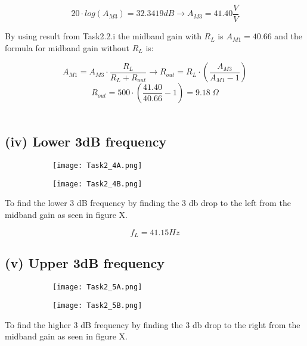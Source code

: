 		$$ 20 \cdot log(A_{M3}) = 32.3419 dB  \rightarrow A_{M3} = 41.40 \frac{V}{V}$$


	By using result from Task2.2.i the midband gain with $R_{L}$ is $A_{M1} = 40.66$ and the formula for midband gain without $R_{L}$ is:

	$$A_{M1} = A_{M3} \cdot \frac{R_{L}}{R_{L} + R_{out}} \rightarrow R_{out} = R_{L} \cdot (\frac{A_{M3}}{A_{M1} - 1})  $$
	$$R_{out} = 500 \cdot (\frac{41.40}{40.66}-1) = 9.18\ \Omega$$ \\


	\subsection*{(iv) Lower 3dB frequency}

	\begin{figure}[h!]
	    \centering
	    \begin{subfigure}[h]{0.7\textwidth}
	            \texttt{[image: Task2\_4A.png]}
	            \label{fig:}
	    \end{subfigure}
	    \begin{subfigure}[h]{0.25\textwidth}
	            \texttt{[image: Task2\_4B.png]}
	            \label{fig:}
	    \end{subfigure}
	\end{figure}

	To find the lower 3 dB frequency by finding the 3 db drop to the left from the midband gain as seen in figure X.

	$$f_{L} =  41.15 Hz$$




	
	\subsection*{(v) Upper 3dB frequency}

	\begin{figure}[h!]
	    \centering
	    \begin{subfigure}[h]{0.7\textwidth}
	            \texttt{[image: Task2\_5A.png]}
	            \label{fig:}
	    \end{subfigure}
	    \begin{subfigure}[h]{0.25\textwidth}
	            \texttt{[image: Task2\_5B.png]}
	            \label{fig:}
	    \end{subfigure}
	\end{figure}
	To find the higher 3 dB frequency by finding the 3 db drop to the right from the midband gain as seen in figure X.

